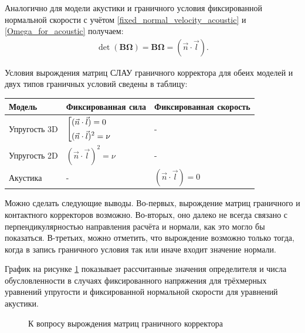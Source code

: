 Аналогично для модели акустики и граничного условия фиксированной 
нормальной скорости с учётом \ref{fixed_normal_velocity_acoustic} 
и \ref{Omega_for_acoustic} получаем:
\begin{eqnarray}
\label{BOmega_acoustic}
	\det (\mathbf{B} \mathbf{\Omega}) = \mathbf{B} \mathbf{\Omega} = (\vec{n} \cdot \vec{l}).
\end{eqnarray}

Условия вырождения матриц СЛАУ граничного корректора для обеих моделей и 
двух типов граничных условий сведены в таблицу:
\begin{center}
    \begin{tabular}{ | l | l | l | }
    \hline
    Модель & Фиксированная сила & Фиксированная скорость \\ \hline
    Упругость 3D & $\left[ \begin{gathered} (\vec{n} \cdot \vec{l}) = 0  \hfill \\ (\vec{n} \cdot \vec{l})^2 = \nu \hfill \\ \end{gathered} \right.$
 & - \\ \hline
    Упругость 2D & $(\vec{n} \cdot \vec{l})^2 = \nu$ & -  \\ \hline
    Акустика & - & $(\vec{n} \cdot \vec{l}) = 0$     \\ \hline
    \end{tabular}
\end{center}

Можно сделать следующие выводы. 
Во-первых, вырождение матриц граничного и контактного корректоров возможно. 
Во-вторых, оно далеко не всегда связано с перпендикулярностью направления 
расчёта и нормали, как это могло бы показаться. 
В-третьих, можно отметить, что вырождение возможно только тогда, 
когда в запись граничного условия так или иначе входит значение нормали.

График на рисунке \ref{pic:corrector_conditional} показывает рассчитанные 
значения определителя и числа обусловленности в случаях 
фиксированного напряжения для трёхмерных уравнений упругости и 
фиксированной нормальной скорости для уравнений акустики. 
\begin{figure}[H]
	\caption{К вопросу вырождения матриц граничного корректора}
	\label{pic:corrector_conditional}
\end{figure}

